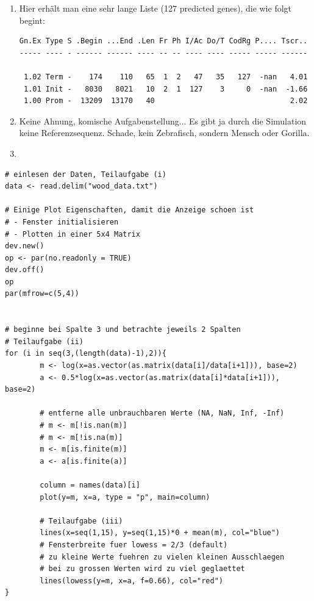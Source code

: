 \documentclass{homework}
\begin{document}
\begin{enumerate}
\begin{enumerate}
\item 
Hier erhält man eine sehr lange Liste (127 predicted genes), die wie folgt begint:
\begin{verbatim}
Gn.Ex Type S .Begin ...End .Len Fr Ph I/Ac Do/T CodRg P.... Tscr..
----- ---- - ------ ------ ---- -- -- ---- ---- ----- ----- ------

 1.02 Term -    174    110   65  1  2   47   35   127  -nan   4.01
 1.01 Init -   8030   8021   10  2  1  127    3     0  -nan  -1.66
 1.00 Prom -  13209  13170   40                               2.02
\end{verbatim}
\item 
Keine Ahnung, komische Aufgabenstellung... Es gibt ja durch die Simulation keine Referenzsequenz.
Schade, kein Zebrafisch, sondern Mensch oder Gorilla.
\item 
\end{enumerate}


\begin{verbatim}
# einlesen der Daten, Teilaufgabe (i)
data <- read.delim("wood_data.txt")

# Einige Plot Eigenschaften, damit die Anzeige schoen ist
# - Fenster initialisieren
# - Plotten in einer 5x4 Matrix
dev.new()
op <- par(no.readonly = TRUE)
dev.off()
op
par(mfrow=c(5,4))


# beginne bei Spalte 3 und betrachte jeweils 2 Spalten
# Teilaufgabe (ii)
for (i in seq(3,(length(data)-1),2)){
		m <- log(x=as.vector(as.matrix(data[i]/data[i+1])), base=2)
		a <- 0.5*log(x=as.vector(as.matrix(data[i]*data[i+1])), base=2)
	
		# entferne alle unbrauchbaren Werte (NA, NaN, Inf, -Inf)
		# m <- m[!is.nan(m)]
		# m <- m[!is.na(m)]
		m <- m[is.finite(m)]
		a <- a[is.finite(a)]
		
		column = names(data)[i]				
		plot(y=m, x=a, type = "p", main=column)	

        # Teilaufgabe (iii)
		lines(x=seq(1,15), y=seq(1,15)*0 + mean(m), col="blue")
		# Fensterbreite fuer lowess = 2/3 (default)
		# zu kleine Werte fuehren zu vielen kleinen Ausschlaegen
		# bei zu grossen Werten wird zu viel geglaettet
		lines(lowess(y=m, x=a, f=0.66), col="red")
}
\end{verbatim}


\end{enumerate}
\end{document}
